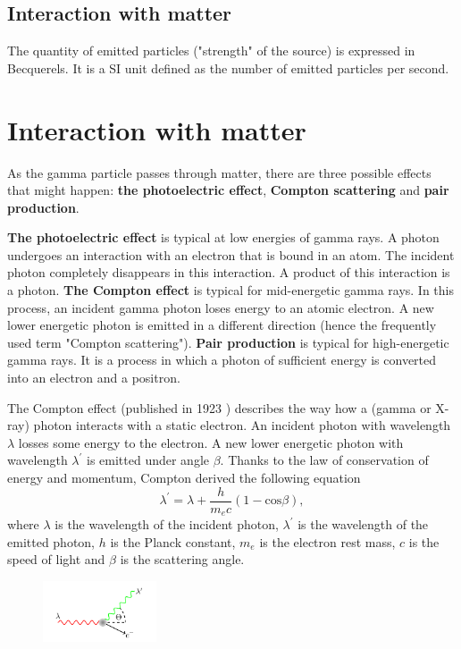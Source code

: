 {  \subsection{Interaction with matter}

  The quantity of emitted particles ("strength" of the source) is expressed in Becquerels.
  It is a SI unit defined as the number of emitted particles per second.

  \section{Interaction with matter}
  As the gamma particle passes through matter, there are three possible effects that might happen:
  \textbf{the photoelectric effect}, \textbf{Compton scattering} and \textbf{pair production}.

  \textbf{The photoelectric effect} is typical at low energies of gamma rays. A photon undergoes an interaction with an electron that is bound in an atom. The incident photon completely disappears in this interaction. A product of this interaction is a photon.
  \textbf{The Compton effect} is typical for mid-energetic gamma rays. In this process, an incident gamma photon loses energy to an atomic electron. A new lower energetic photon is emitted in a different direction (hence the frequently used term "Compton scattering").
  \textbf{Pair production} is typical for high-energetic gamma rays. It is a process in which a photon of sufficient energy is converted into an electron and a positron.

  The Compton effect (published in 1923 \cite{}) describes the way how a (gamma or X-ray) photon interacts with a static electron. An incident photon with wavelength $\lambda$ losses some energy to the electron. A new lower energetic photon with wavelength $\lambda^{\prime}$ is emitted under angle $\beta$. Thanks to the law of conservation of energy and momentum, Compton derived the following equation
  \begin{equation}
      \lambda^{\prime} = \lambda + \frac{h}{m_{e}c}(1-\mathrm{cos} \beta),
  \end{equation}
  where $\lambda$ is the wavelength of the incident photon, $\lambda^{\prime}$ is the wavelength of the emitted photon, $h$ is the Planck constant, $m_{e}$ is the electron rest mass, $c$ is the speed of light and $\beta$ is the scattering angle.

  \begin{figure}[!h]
      \centering
      \includegraphics[width=0.3\textwidth]{./fig/photos/scattering.png}
  \end{figure}


}
